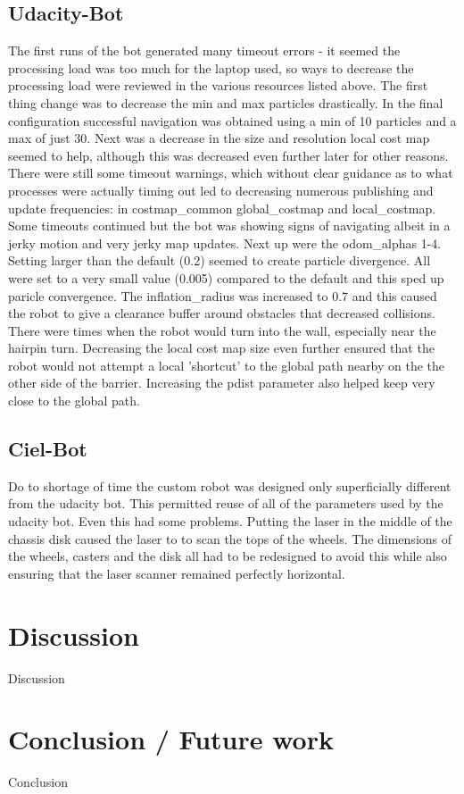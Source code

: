 \documentclass[10pt,journal,compsoc]{IEEEtran}
\begin{document}
\subsection{Udacity-Bot}
The first runs of the bot generated many timeout errors - it seemed the processing load was too much for the laptop used, so ways to decrease the processing load were reviewed in the various resources listed above. The first thing change was to decrease the min and max particles drastically. In the final configuration successful navigation was obtained using a min of 10 particles and a max of just 30. Next was a decrease in the size and resolution local cost map seemed to help, although this was decreased even further later for other reasons. 
There were still some timeout warnings, which without clear guidance as to what processes were actually timing out led to decreasing numerous publishing and update frequencies: in costmap\_common global\_costmap and local\_costmap. Some timeouts continued but the bot was showing signs of navigating albeit in a jerky motion and very jerky map updates. Next up were the odom\_alphas 1-4. Setting larger than the default (0.2) seemed to create particle divergence. All were set to a very small value (0.005) compared to the default and this sped up paricle convergence. The inflation\_radius was increased to 0.7 and this caused the robot to give a clearance buffer around obstacles that decreased collisions. There were times when the robot would turn into the wall, especially near the hairpin turn. Decreasing the local cost map size even further ensured that the robot would not attempt a local 'shortcut' to the global path nearby on the the other side of the barrier. Increasing the pdist parameter also helped keep very close to the global path.

\subsection{Ciel-Bot}
Do to shortage of time the custom robot was designed only superficially different from the udacity bot. This permitted reuse of all of the parameters used by the udacity bot. Even this had some problems. Putting the laser in the middle of the chassis disk caused the laser to to scan the tops of the wheels. The dimensions of the wheels, casters and the disk all had to be redesigned to avoid this while also ensuring that the laser scanner remained perfectly horizontal.


\section{Discussion}
Discussion

\section{Conclusion / Future work}
Conclusion
\end{document}

